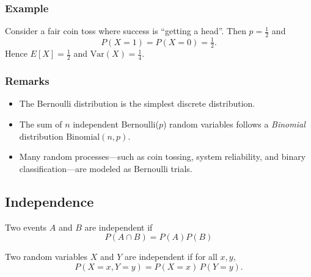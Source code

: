 \subsubsection{Example}
Consider a fair coin toss where success is ``getting a head''.
Then $p=\tfrac{1}{2}$ and
\[
P(X=1)=P(X=0)=\tfrac{1}{2}.
\]
Hence $E[X]=\tfrac{1}{2}$ and $\text{Var}(X)=\tfrac{1}{4}$.

\subsubsection{Remarks}
\begin{itemize}
  \item The Bernoulli distribution is the simplest discrete distribution.
  \item The sum of $n$ independent Bernoulli($p$) random variables follows
        a \emph{Binomial} distribution $\text{Binomial}(n,p)$.
  \item Many random processes—such as coin tossing, system reliability,
        and binary classification—are modeled as Bernoulli trials.
\end{itemize}


\subsection{Independence}

Two events $A$ and $B$ are independent if
\[
P(A\cap B)=P(A)P(B)
\]

Two random variables $X$ and $Y$ are independent if for all $x,y$,
\[
P(X=x, Y=y)=P(X=x)\,P(Y=y).
\]

